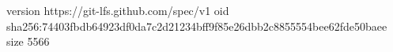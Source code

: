 version https://git-lfs.github.com/spec/v1
oid sha256:74403fbdb64923df0da7c2d21234bff9f85e26dbb2c8855554bee62fde50baee
size 5566

